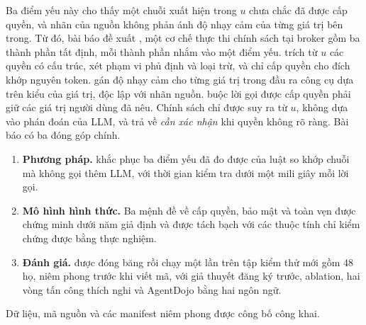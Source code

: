 Ba điểm yếu này cho thấy một chuỗi xuất hiện trong $u$ chưa chắc đã được cấp quyền, và nhãn của nguồn không phản ánh độ
nhạy cảm của từng giá trị bên trong. Từ đó, bài báo đề xuất \ours, một cơ chế thực thi chính sách tại broker gồm ba thành
phần tất định, mỗi thành phần nhắm vào một điểm yếu. \POne{} trích từ $u$ các quyền có cấu trúc, xét phạm vi phủ định và
loại trừ, và chỉ cấp quyền cho đích khớp nguyên token. \PTwo{} gán độ nhạy cảm cho từng giá trị trong đầu ra công cụ dựa
trên kiểu của giá trị, độc lập với nhãn nguồn. \PThree{} buộc lời gọi được cấp quyền phải giữ các giá trị người dùng đã
nêu. Chính sách chỉ được suy ra từ $u$, không dựa vào phán đoán của LLM, và trả về \emph{cần xác nhận} khi quyền không rõ
ràng. Bài báo có ba đóng góp chính.
\begin{enumerate}
\item \textbf{Phương pháp.} \ours{} khắc phục ba điểm yếu đã đo được của luật so khớp chuỗi mà không gọi thêm LLM, với
  thời gian kiểm tra dưới một mili giây mỗi lời gọi.
\item \textbf{Mô hình hình thức.} Ba mệnh đề về cấp quyền, bảo mật và toàn vẹn được chứng minh dưới năm giả định và được
  tách bạch với các thuộc tính chỉ kiểm chứng được bằng thực nghiệm.
\item \textbf{Đánh giá.} \ours{} được đóng băng rồi chạy một lần trên tập kiểm thử mới gồm 48 họ, niêm phong trước khi
  viết mã, với giả thuyết đăng ký trước, ablation, hai vòng tấn công thích nghi và AgentDojo bằng hai ngôn ngữ.
\end{enumerate}
Dữ liệu, mã nguồn và các manifest niêm phong được công bố công khai.
